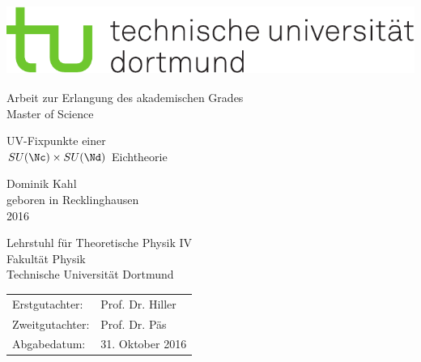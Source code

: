 \thispagestyle{empty}

\begin{titlepage}

\raggedright
\includegraphics[height=0.9in]
{../../header/tu-logo.pdf}

\centering

\vspace*{0.5in}

\normalfont\Large
Arbeit zur  Erlangung des akademischen Grades
\\[0.5em]
Master of Science

\vspace*{0.25in}
\huge
UV-Fixpunkte einer
\\[0.25em]
 $SU(\Nc)\times SU(\Nd)$ Eichtheorie

\vspace*{0.5in}

\normalfont\large
Dominik Kahl 
\\[0.5em]
geboren in Recklinghausen
\\[1.5em]
2016

\vfill

Lehrstuhl für Theoretische Physik IV
\\[0.5em]
Fakultät Physik
\\[0.5em]
Technische Universität Dortmund
\par

\clearpage
\thispagestyle{empty}
\raggedright


\vspace*{\fill}

\begin{tabular}{ll}
Erstgutachter: & Prof. Dr. Hiller	\\
Zweitgutachter:& Prof. Dr. Päs		\\
Abgabedatum:   & 31. Oktober 2016	
\end{tabular}




\end{titlepage}